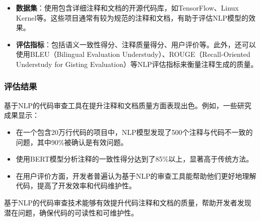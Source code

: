 \documentclass{article}
\begin{document}
\begin{itemize}
    \item \textbf{数据集}：使用包含详细注释和文档的开源代码库，如TensorFlow、Linux Kernel等。这些项目通常有较为规范的注释和文档，有助于评估NLP模型的效果。
    \item \textbf{评估指标}：包括语义一致性得分、注释质量得分、用户评价等。此外，还可以使用BLEU（Bilingual Evaluation Understudy）、ROUGE（Recall-Oriented Understudy for Gisting Evaluation）等NLP评估指标来衡量注释生成的质量。
\end{itemize}

\subsubsection{评估结果}

基于NLP的代码审查工具在提升注释和文档质量方面表现出色。例如，一些研究成果显示：

\begin{itemize}
    \item 在一个包含20万行代码的项目中，NLP模型发现了500个注释与代码不一致的问题，其中90\%被确认是有效问题。
    \item 使用BERT模型分析注释的一致性得分达到了85\%以上，显著高于传统方法。
    \item 在用户评价方面，开发者普遍认为基于NLP的审查工具能帮助他们更好地理解代码，提高了开发效率和代码维护性。
\end{itemize}

基于NLP的代码审查技术能够有效提升代码注释和文档的质量，帮助开发者发现潜在问题，确保代码的可读性和可维护性。
\end{document}
